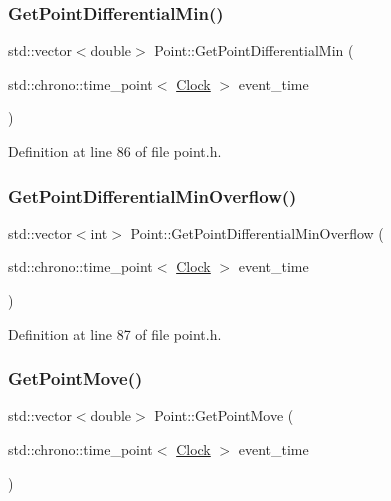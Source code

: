 \subsubsection{\texorpdfstring{Get\+Point\+Differential\+Min()}{GetPointDifferentialMin()}}
{\footnotesize\ttfamily std\+::vector$<$double$>$ Point\+::\+Get\+Point\+Differential\+Min (\begin{DoxyParamCaption}\item[{std\+::chrono\+::time\+\_\+point$<$ \hyperlink{universe_8h_a0ef8d951d1ca5ab3cfaf7ab4c7a6fd80}{Clock} $>$}]{event\+\_\+time }\end{DoxyParamCaption})\hspace{0.3cm}{\ttfamily [inline]}}



Definition at line 86 of file point.\+h.

\mbox{\label{class_point_adbc225afbd532763617db1acdb81ef4c}} 
\subsubsection{\texorpdfstring{Get\+Point\+Differential\+Min\+Overflow()}{GetPointDifferentialMinOverflow()}}
{\footnotesize\ttfamily std\+::vector$<$int$>$ Point\+::\+Get\+Point\+Differential\+Min\+Overflow (\begin{DoxyParamCaption}\item[{std\+::chrono\+::time\+\_\+point$<$ \hyperlink{universe_8h_a0ef8d951d1ca5ab3cfaf7ab4c7a6fd80}{Clock} $>$}]{event\+\_\+time }\end{DoxyParamCaption})\hspace{0.3cm}{\ttfamily [inline]}}



Definition at line 87 of file point.\+h.

\mbox{\label{class_point_a46d06a6d5e8107a0321ede4ca162f264}} 
\subsubsection{\texorpdfstring{Get\+Point\+Move()}{GetPointMove()}}
{\footnotesize\ttfamily std\+::vector$<$double$>$ Point\+::\+Get\+Point\+Move (\begin{DoxyParamCaption}\item[{std\+::chrono\+::time\+\_\+point$<$ \hyperlink{universe_8h_a0ef8d951d1ca5ab3cfaf7ab4c7a6fd80}{Clock} $>$}]{event\+\_\+time }\end{DoxyParamCaption})\hspace{0.3cm}{\ttfamily [inline]}}



